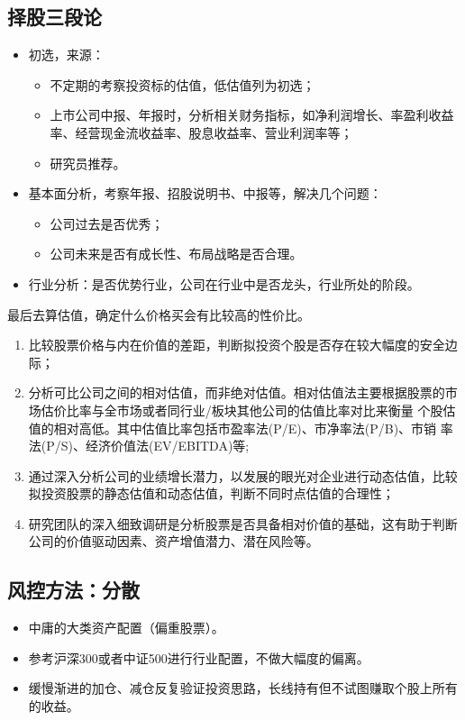 \documentclass[journal=jacsat,manuscript=article]{achemso}
\begin{document}
\subsection{择股三段论}

\begin{itemize}
\item 初选，来源：
\begin{itemize}
  \item 不定期的考察投资标的估值，低估值列为初选；
  \item 上市公司中报、年报时，分析相关财务指标，如净利润增长、率盈利收益率、经营现金流收益率、股息收益率、营业利润率等；
  \item 研究员推荐。
  \end{itemize}
\item 基本面分析，考察年报、招股说明书、中报等，解决几个问题：
\begin{itemize}
  \item 公司过去是否优秀；
  \item 公司未来是否有成长性、布局战略是否合理。
\end{itemize}
\item 行业分析：是否优势行业，公司在行业中是否龙头，行业所处的阶段。
\end{itemize}

最后去算估值，确定什么价格买会有比较高的性价比。

\begin{enumerate}
\item 比较股票价格与内在价值的差距，判断拟投资个股是否存在较大幅度的安全边际；
\item 分析可比公司之间的相对估值，而非绝对估值。相对估值法主要根据股票的市场估价比率与全市场或者同行业/板块其他公司的估值比率对比来衡量 个股估值的相对高低。其中估值比率包括市盈率法(P/E)、市净率法(P/B)、市销 率法(P/S)、经济价值法(EV/EBITDA)等;
\item 通过深入分析公司的业绩增长潜力，以发展的眼光对企业进行动态估值，比较拟投资股票的静态估值和动态估值，判断不同时点估值的合理性；
\item 研究团队的深入细致调研是分析股票是否具备相对价值的基础，这有助于判断公司的价值驱动因素、资产增值潜力、潜在风险等。
\end{enumerate}

\subsection{风控方法：分散}

\begin{itemize}
\item 中庸的大类资产配置（偏重股票）。
\item 参考沪深300或者中证500进行行业配置，不做大幅度的偏离。
\item 缓慢渐进的加仓、减仓反复验证投资思路，长线持有但不试图赚取个股上所有的收益。
\end{itemize}
\end{document}
